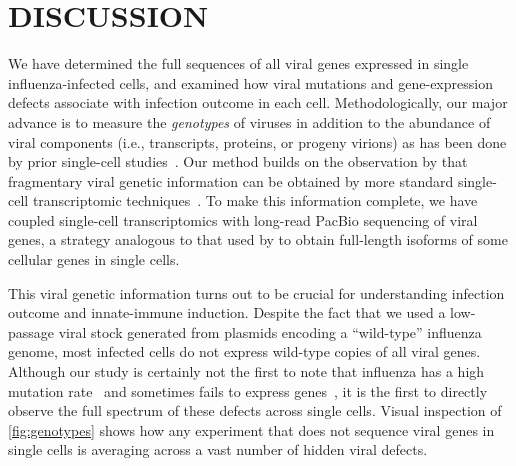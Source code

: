 \documentclass[10pt,letterpaper]{article}
\newcommand{\FIG}[1]{\autoref{fig:#1}}
\begin{document}
\section*{DISCUSSION}
We have determined the full sequences of all viral genes expressed in single influenza-infected cells, and examined how viral mutations and gene-expression defects associate with infection outcome in each cell.
Methodologically, our major advance is to measure the \emph{genotypes} of viruses in addition to the abundance of viral components (i.e., transcripts, proteins, or progeny virions) as has been done by prior single-cell studies~\citep{russell2018extreme, zanini2018single, zanini2018virus, steuerman2018dissection, saikia2018simultaneous, oneal2018west, zhu2009growth, schulte2014single, akpinar2016high, heldt2015single, brooke2013most}.
Our method builds on the observation by that fragmentary viral genetic information can be obtained by more standard single-cell transcriptomic techniques~\citep{saikia2018simultaneous, zanini2018virus}.
To make this information complete, we have coupled single-cell transcriptomics with long-read PacBio sequencing of viral genes, a strategy analogous to that used by \citep{gupta2018single} to obtain full-length isoforms of some cellular genes in single cells.

This viral genetic information turns out to be crucial for understanding infection outcome and innate-immune induction.
Despite the fact that we used a low-passage viral stock generated from plasmids encoding a ``wild-type'' influenza genome, most infected cells do not express wild-type copies of all viral genes.
Although our study is certainly not the first to note that influenza has a high mutation rate~\citep{parvin1986measurement, suarez1992heterogeneity, suarez1994estimation, bloom2014experimentally, pauly2017novel} and sometimes fails to express genes~\citep{brooke2013most, heldt2015single, dou2017analysis, russell2018extreme}, it is the first to directly observe the full spectrum of these defects across single cells.
Visual inspection of \FIG{genotypes} shows how any experiment that does not sequence viral genes in single cells is averaging across a vast number of hidden viral defects.
\end{document}
